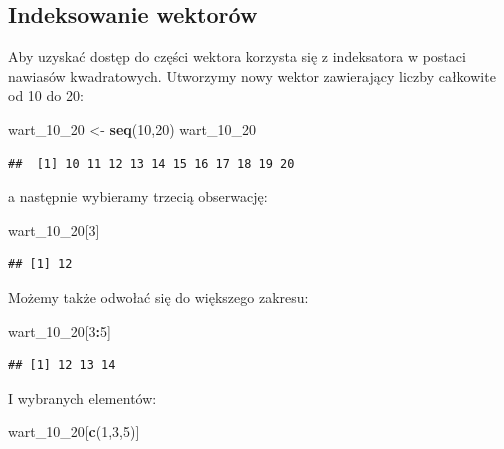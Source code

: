 \documentclass[]{book}
\newenvironment{Shaded}{\begin{snugshade}}{\end{snugshade}}
\newcommand{\KeywordTok}[1]{\textcolor[rgb]{0.13,0.29,0.53}{\textbf{#1}}}
\newcommand{\DecValTok}[1]{\textcolor[rgb]{0.00,0.00,0.81}{#1}}
\newcommand{\StringTok}[1]{\textcolor[rgb]{0.31,0.60,0.02}{#1}}
\newcommand{\OperatorTok}[1]{\textcolor[rgb]{0.81,0.36,0.00}{\textbf{#1}}}
\newcommand{\NormalTok}[1]{#1}
\begin{document}
\subsection{Indeksowanie wektorów}\label{indeksowanie-wektorow}

Aby uzyskać dostęp do części wektora korzysta się z indeksatora w
postaci nawiasów kwadratowych. Utworzymy nowy wektor zawierający liczby
całkowite od 10 do 20:

\begin{Shaded}
\begin{Highlighting}[]
\NormalTok{wart_10_}\DecValTok{20}\NormalTok{ <-}\StringTok{ }\KeywordTok{seq}\NormalTok{(}\DecValTok{10}\NormalTok{,}\DecValTok{20}\NormalTok{)}
\NormalTok{wart_10_}\DecValTok{20}
\end{Highlighting}
\end{Shaded}

\begin{verbatim}
##  [1] 10 11 12 13 14 15 16 17 18 19 20
\end{verbatim}

a następnie wybieramy trzecią obserwację:

\begin{Shaded}
\begin{Highlighting}[]
\NormalTok{wart_10_}\DecValTok{20}\NormalTok{[}\DecValTok{3}\NormalTok{]}
\end{Highlighting}
\end{Shaded}

\begin{verbatim}
## [1] 12
\end{verbatim}

Możemy także odwołać się do większego zakresu:

\begin{Shaded}
\begin{Highlighting}[]
\NormalTok{wart_10_}\DecValTok{20}\NormalTok{[}\DecValTok{3}\OperatorTok{:}\DecValTok{5}\NormalTok{]}
\end{Highlighting}
\end{Shaded}

\begin{verbatim}
## [1] 12 13 14
\end{verbatim}

I wybranych elementów:

\begin{Shaded}
\begin{Highlighting}[]
\NormalTok{wart_10_}\DecValTok{20}\NormalTok{[}\KeywordTok{c}\NormalTok{(}\DecValTok{1}\NormalTok{,}\DecValTok{3}\NormalTok{,}\DecValTok{5}\NormalTok{)]}
\end{Highlighting}
\end{Shaded}
\end{document}
